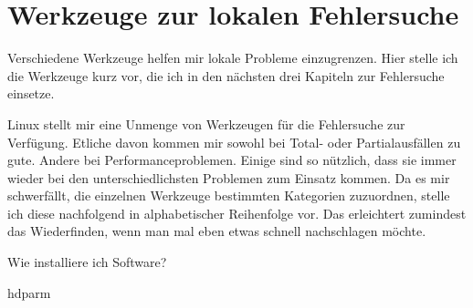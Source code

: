 \chapter{Werkzeuge zur lokalen Fehlersuche}
\label{cha:lokal-werkzeuge}

\begin{abstractsec}
  Verschiedene Werkzeuge helfen mir lokale Probleme einzugrenzen. Hier stelle
  ich die Werkzeuge kurz vor, die ich in den nächsten drei Kapiteln zur
  Fehlersuche einsetze.
\end{abstractsec}

\begin{normaltext}
  Linux stellt mir eine Unmenge von Werkzeugen für die Fehlersuche zur
  Verfügung. Etliche davon kommen mir sowohl bei Total- oder Partialausfällen
  zu gute. Andere bei Performanceproblemen. Einige sind so nützlich, dass sie
  immer wieder bei den unterschiedlichsten Problemen zum Einsatz kommen. Da
  es mir schwerfällt, die einzelnen Werkzeuge bestimmten Kategorien
  zuzuordnen, stelle ich diese nachfolgend in alphabetischer Reihenfolge vor.
  Das erleichtert zumindest das Wiederfinden, wenn man mal eben etwas schnell
  nachschlagen möchte.
\end{normaltext}

\begin{notes}
\item Wie installiere ich Software?
\item hdparm
\end{notes}

